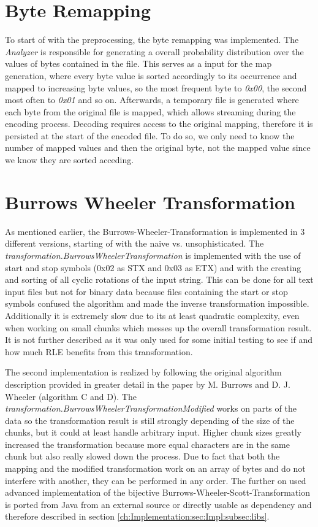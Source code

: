 \section{Byte Remapping}
\label{ch:Implementation:bytemapping}
\par{
	To start of with the preprocessing, the byte remapping was implemented. The \emph{Analyzer} is responsible for generating a overall probability distribution over the values of bytes contained in the file. This serves as a input for the map generation, where every byte value is sorted accordingly to its occurrence and mapped to increasing byte values, so the most frequent byte to \textit{0x00}, the second most often to \textit{0x01} and so on. Afterwards, a temporary file is generated where each byte from the original file is mapped, which allows streaming during the encoding process. Decoding requires access to the original mapping, therefore it is persisted at the start of the encoded file. To do so, we only need to know the number of mapped values and then the original byte, not the mapped value since we know they are sorted acceding.
}
\section{Burrows Wheeler Transformation}
\label{ch:Implementation:bwt}
\par{
	As mentioned earlier, the Burrows-Wheeler-Transformation is implemented in 3 different versions, starting of with the naive vs. unsophisticated. The \emph{transformation.BurrowsWheelerTransformation} is implemented with the use of start and stop symbols (0x02 as STX and 0x03 as ETX) and with the creating and sorting of all cyclic rotations of the input string. This can be done for all text input files but not for binary data because files containing the start or stop symbols confused the algorithm and made the inverse transformation impossible. Additionally it is extremely slow due to its at least quadratic complexity, even when working on small chunks which messes up the overall transformation result. It is not further described as it was only used for some initial testing to see if and how much RLE benefits from this transformation. 
}
\par{
	The second implementation is realized by following the original algorithm description provided in greater detail in the paper by M. Burrows and D. J. Wheeler \cite{Burrows94} (algorithm C and D). The \emph{transformation.BurrowsWheelerTransformationModified} works on parts of the data so the transformation result is still strongly depending of the size of the chunks, but it could at least handle arbitrary input. Higher chunk sizes greatly increased the transformation because more equal characters are in the same chunk but also really slowed down the process. Due to fact that both the mapping and the modified transformation work on an array of bytes and do not interfere with another, they can be performed in any order. The further on used advanced implementation of the bijective Burrows-Wheeler-Scott-Transformation is ported from Java from an external source or directly usable as dependency and therefore described in section \ref{ch:Implementation:sec:Impl:subsec:libs}.
}
